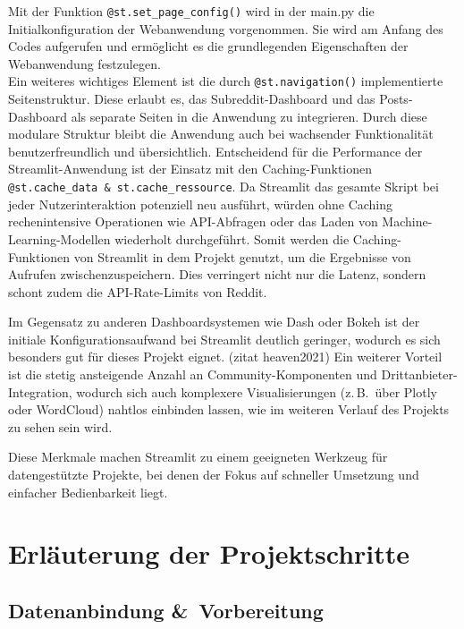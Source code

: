 Mit der Funktion \verb|@st.set_page_config()| wird in der main.py die Initialkonfiguration der Webanwendung vorgenommen. Sie wird am Anfang des Codes aufgerufen und ermöglicht es die grundlegenden Eigenschaften der Webanwendung festzulegen. \\ %
Ein weiteres wichtiges Element ist die durch \verb|@st.navigation()| implementierte Seitenstruktur. Diese erlaubt es, das Subreddit-Dashboard und das Posts-Dashboard als separate Seiten in die Anwendung zu integrieren. Durch diese modulare Struktur bleibt die Anwendung auch bei wachsender Funktionalität benutzerfreundlich und übersichtlich.
Entscheidend für die Performance der Streamlit-Anwendung ist der Einsatz mit den Caching-Funktionen \verb|@st.cache_data & st.cache_ressource|. Da Streamlit das gesamte Skript bei jeder Nutzerinteraktion potenziell neu ausführt, würden ohne Caching rechenintensive Operationen wie API-Abfragen oder das Laden von Machine-Learning-Modellen wiederholt durchgeführt. Somit werden die Caching-Funktionen von Streamlit in dem Projekt genutzt, um die Ergebnisse von Aufrufen zwischenzuspeichern. Dies verringert nicht nur die Latenz, sondern schont zudem die API-Rate-Limits von Reddit.

Im Gegensatz zu anderen Dashboardsystemen wie Dash oder Bokeh ist der initiale Konfigurationsaufwand bei Streamlit deutlich geringer, wodurch es sich besonders gut für dieses Projekt eignet. (zitat heaven2021) 
Ein weiterer Vorteil ist die stetig ansteigende Anzahl an Community-Komponenten und Drittanbieter-Integration, wodurch sich auch komplexere Visualisierungen (z.\,B.\ über Plotly oder WordCloud) nahtlos einbinden lassen, wie im weiteren Verlauf des Projekts zu sehen sein wird. 

Diese Merkmale machen Streamlit zu einem geeigneten Werkzeug für datengestützte Projekte, bei denen der Fokus auf schneller Umsetzung und einfacher Bedienbarkeit liegt.


\section{Erläuterung der Projektschritte}

\subsection{Datenanbindung \&~Vorbereitung}


